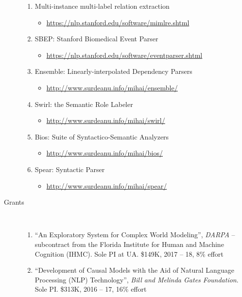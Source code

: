 \documentclass[10pt]{article}
\newcommand{\ve}[1]{{\em #1}} %
\newcommand{\ti}[1]{``#1''} %
\begin{document}
\begin{description}
\begin{enumerate}
\item Multi-instance multi-label relation extraction
\begin{itemize}
\item \url{https://nlp.stanford.edu/software/mimlre.shtml}
\end{itemize}

\item SBEP: Stanford Biomedical Event Parser 
\begin{itemize}
\item \url{https://nlp.stanford.edu/software/eventparser.shtml}
\end{itemize}

\item Ensemble: Linearly-interpolated Dependency Parsers
\begin{itemize}
\item \url{http://www.surdeanu.info/mihai/ensemble/ }
\end{itemize}

\item Swirl: the Semantic Role Labeler
\begin{itemize}
\item \url{http://www.surdeanu.info/mihai/swirl/}
\end{itemize}

\item Bios: Suite of Syntactico-Semantic Analyzers
\begin{itemize}
\item \url{http://www.surdeanu.info/mihai/bios/ }
\end{itemize}

\item Spear: Syntactic Parser
\begin{itemize}
\item \url{http://www.surdeanu.info/mihai/spear/ }
\end{itemize}

\end{enumerate}


\item [Grants]\
\begin{enumerate}

\item \ti{An Exploratory System for Complex World Modeling}, \ve{DARPA} -- subcontract from the Florida Institute for Human and Machine Cognition (IHMC). Sole PI at UA. \$149K, 2017 -- 18, 8\% effort

\item \ti{Development of Causal Models with the Aid of Natural Language Processing (NLP) Technology}, \ve{Bill and Melinda Gates Foundation}. Sole PI. \$313K, 2016 -- 17, 16\% effort


\end{enumerate}
\end{description}
\end{document}
